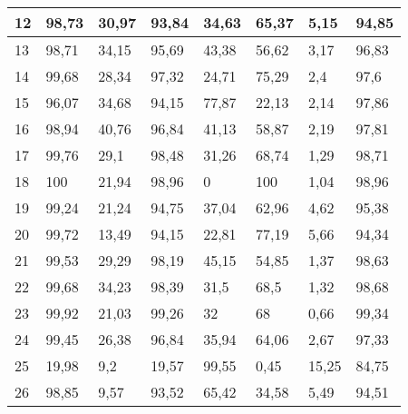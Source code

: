 \begin{longtable}[c]{|l|l|l|l|l|l|l|l|}
12              & 98,73        & 30,97        & 93,84       & 34,63         & 65,37         & 5,15          & 94,85         \\ \hline
13              & 98,71        & 34,15        & 95,69       & 43,38         & 56,62         & 3,17          & 96,83         \\ \hline
14              & 99,68        & 28,34        & 97,32       & 24,71         & 75,29         & 2,4           & 97,6          \\ \hline
15              & 96,07        & 34,68        & 94,15       & 77,87         & 22,13         & 2,14          & 97,86         \\ \hline
16              & 98,94        & 40,76        & 96,84       & 41,13         & 58,87         & 2,19          & 97,81         \\ \hline
17              & 99,76        & 29,1         & 98,48       & 31,26         & 68,74         & 1,29          & 98,71         \\ \hline
18              & 100          & 21,94        & 98,96       & 0             & 100           & 1,04          & 98,96         \\ \hline
19              & 99,24        & 21,24        & 94,75       & 37,04         & 62,96         & 4,62          & 95,38         \\ \hline
20              & 99,72        & 13,49        & 94,15       & 22,81         & 77,19         & 5,66          & 94,34         \\ \hline
21              & 99,53        & 29,29        & 98,19       & 45,15         & 54,85         & 1,37          & 98,63         \\ \hline
22              & 99,68        & 34,23        & 98,39       & 31,5          & 68,5          & 1,32          & 98,68         \\ \hline
23              & 99,92        & 21,03        & 99,26       & 32            & 68            & 0,66          & 99,34         \\ \hline
24              & 99,45        & 26,38        & 96,84       & 35,94         & 64,06         & 2,67          & 97,33         \\ \hline
25              & 19,98        & 9,2          & 19,57       & 99,55         & 0,45          & 15,25         & 84,75         \\ \hline
26              & 98,85        & 9,57         & 93,52       & 65,42         & 34,58         & 5,49          & 94,51         \\ \hline

\end{longtable}

